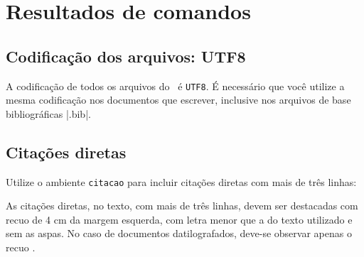 

\makeatletter
\renewcommand{\IBGEtab}[3]{%
	\savebox{\myptabbox}{{\ABNTEXfontereduzida #2}}%
	\settowidth{\myptabboxwidth}{\usebox{\myptabbox}}%
	\centering%
	\parbox{\myptabboxwidth}{%
		\configurecaptions
		#1%
		{\ABNTEXfontereduzida%
			#2%
		}%
		#3}%
}

\chapter{Resultados de comandos}\label{cap_exemplos}


\section{Codificação dos arquivos: UTF8}

A codificação de todos os arquivos do \abnTeX\ é \texttt{UTF8}. É necessário que
você utilize a mesma codificação nos documentos que escrever, inclusive nos
arquivos de base bibliográficas |.bib|.

\section{Citações diretas}
\label{sec-citacao}

Utilize o ambiente \texttt{citacao} para incluir
citações diretas com mais de três linhas:

\begin{citacao}
As citações diretas, no texto, com mais de três linhas, devem ser
destacadas com recuo de 4 cm da margem esquerda, com letra menor que a do texto
utilizado e sem as aspas. No caso de documentos datilografados, deve-se
observar apenas o recuo \cite{NBR10520:2002}.
\end{citacao}

